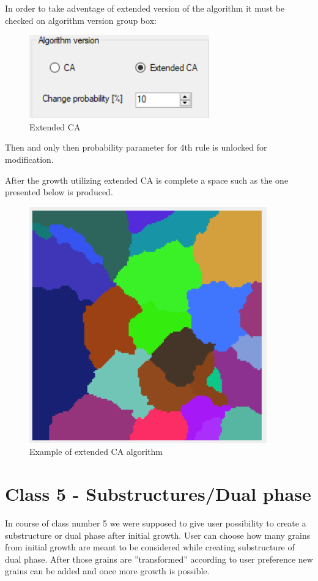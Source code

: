 \documentclass[a4paper, 11pt]{article}
\begin{document}
In order to take adventage of extended version of the algorithm it must be checked on algorithm version group box:
\begin{figure}[H]
\centering
  \includegraphics{ExtendedCAGroupBox}
  \caption{Extended CA}
  \label{fig:boat1}
\end{figure}
Then and only then probability parameter for 4th rule is unlocked for modification.

After the growth utilizing extended CA is complete a space such as the one presented below is produced.
\begin{figure}[H]
\centering
  \includegraphics[]{ExtendedCAExample}
  \caption{Example of extended CA algorithm}
  \label{fig:boat1}
\end{figure}



\section*{Class 5 - Substructures/Dual phase}
In course of class number 5 we were supposed to give user possibility to create a substructure or dual phase after initial growth. User can choose how many grains from initial growth are meant to be considered while creating substructure of dual phase. After those grains are ''transformed'' according to user preference new grains can be added and once more growth is possible.
\end{document}
